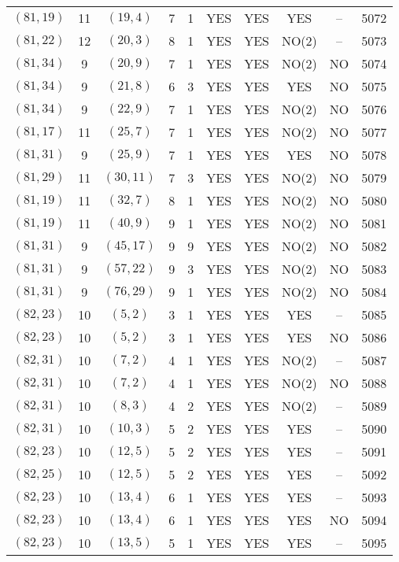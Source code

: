 \begin{longtable}{|c|c|c|c|c|c|c|c|c|c|}
$(81, 19)$ & 11 & $(19, 4)$ & 7 & 1 & YES & YES & YES & -- & 5072\\
$(81, 22)$ & 12 & $(20, 3)$ & 8 & 1 & YES & YES & NO(2) & -- & 5073\\
$(81, 34)$ & 9 & $(20, 9)$ & 7 & 1 & YES & YES & NO(2) & NO & 5074\\
$(81, 34)$ & 9 & $(21, 8)$ & 6 & 3 & YES & YES & YES & NO & 5075\\
$(81, 34)$ & 9 & $(22, 9)$ & 7 & 1 & YES & YES & NO(2) & NO & 5076\\
$(81, 17)$ & 11 & $(25, 7)$ & 7 & 1 & YES & YES & NO(2) & NO & 5077\\
$(81, 31)$ & 9 & $(25, 9)$ & 7 & 1 & YES & YES & YES & NO & 5078\\
$(81, 29)$ & 11 & $(30, 11)$ & 7 & 3 & YES & YES & NO(2) & NO & 5079\\
$(81, 19)$ & 11 & $(32, 7)$ & 8 & 1 & YES & YES & NO(2) & NO & 5080\\
$(81, 19)$ & 11 & $(40, 9)$ & 9 & 1 & YES & YES & NO(2) & NO & 5081\\
$(81, 31)$ & 9 & $(45, 17)$ & 9 & 9 & YES & YES & NO(2) & NO & 5082\\
$(81, 31)$ & 9 & $(57, 22)$ & 9 & 3 & YES & YES & NO(2) & NO & 5083\\
$(81, 31)$ & 9 & $(76, 29)$ & 9 & 1 & YES & YES & NO(2) & NO & 5084\\
$(82, 23)$ & 10 & $(5, 2)$ & 3 & 1 & YES & YES & YES & -- & 5085\\
$(82, 23)$ & 10 & $(5, 2)$ & 3 & 1 & YES & YES & YES & NO & 5086\\
$(82, 31)$ & 10 & $(7, 2)$ & 4 & 1 & YES & YES & NO(2) & -- & 5087\\
$(82, 31)$ & 10 & $(7, 2)$ & 4 & 1 & YES & YES & NO(2) & NO & 5088\\
$(82, 31)$ & 10 & $(8, 3)$ & 4 & 2 & YES & YES & NO(2) & -- & 5089\\
$(82, 31)$ & 10 & $(10, 3)$ & 5 & 2 & YES & YES & YES & -- & 5090\\
$(82, 23)$ & 10 & $(12, 5)$ & 5 & 2 & YES & YES & YES & -- & 5091\\
$(82, 25)$ & 10 & $(12, 5)$ & 5 & 2 & YES & YES & YES & -- & 5092\\
$(82, 23)$ & 10 & $(13, 4)$ & 6 & 1 & YES & YES & YES & -- & 5093\\
$(82, 23)$ & 10 & $(13, 4)$ & 6 & 1 & YES & YES & YES & NO & 5094\\
$(82, 23)$ & 10 & $(13, 5)$ & 5 & 1 & YES & YES & YES & -- & 5095\\

\end{longtable}
